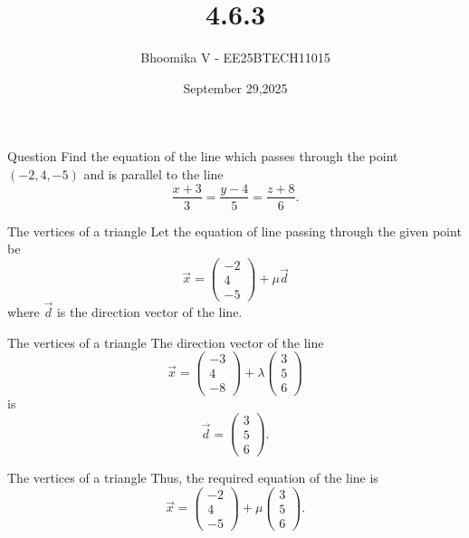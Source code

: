 \documentclass{beamer}
\begin{document}
\title 
{4.6.3}
\date{September 29,2025}


\author 
{Bhoomika V - EE25BTECH11015}




\frame{\titlepage}
\begin{frame}{Question}
Find the equation of the line which passes through the point $(-2,4,-5)$ and is parallel to the line
\[
\frac{x+3}{3} = \frac{y-4}{5} = \frac{z+8}{6}.
\]
\end{frame}

\begin{frame}{The vertices of a triangle}
Let the equation of line passing through the given point be
\[
\vec{x} = 
\begin{pmatrix}
-2 \\ 4 \\ -5
\end{pmatrix}
+ \mu \vec{d}
\]
where $\vec{d}$ is the direction vector of the line.  
\end{frame}


\begin{frame}{The vertices of a triangle}
The direction vector of the line 
\[
\vec{x} = 
\begin{pmatrix}
-3 \\ 4 \\ -8
\end{pmatrix}
+ \lambda
\begin{pmatrix}
3 \\ 5 \\ 6
\end{pmatrix}
\]
is
\[
\vec{d} = 
\begin{pmatrix}
3 \\ 5 \\ 6
\end{pmatrix}.
\tag{1}
\]
\end{frame}


\begin{frame}{The vertices of a triangle}
Thus, the required equation of the line is
\[
\vec{x} =
\begin{pmatrix}
-2 \\ 4 \\ -5
\end{pmatrix}
+ \mu 
\begin{pmatrix}
3 \\ 5 \\ 6
\end{pmatrix}.
\]
\end{frame}
\end{document}
